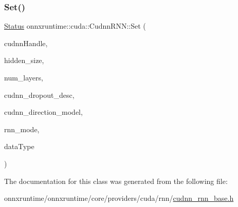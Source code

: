 \subsubsection{\texorpdfstring{Set()}{Set()}}
{\footnotesize\ttfamily \mbox{\hyperlink{classonnxruntime_1_1common_1_1Status}{Status}} onnxruntime\+::cuda\+::\+Cudnn\+R\+N\+N\+::\+Set (\begin{DoxyParamCaption}\item[{const cudnn\+Handle\+\_\+t \&}]{cudnn\+Handle,  }\item[{int64\+\_\+t}]{hidden\+\_\+size,  }\item[{int}]{num\+\_\+layers,  }\item[{cudnn\+Dropout\+Descriptor\+\_\+t}]{cudnn\+\_\+dropout\+\_\+desc,  }\item[{cudnn\+Direction\+Mode\+\_\+t}]{cudnn\+\_\+direction\+\_\+model,  }\item[{cudnn\+R\+N\+N\+Mode\+\_\+t}]{rnn\+\_\+mode,  }\item[{cudnn\+Data\+Type\+\_\+t}]{data\+Type }\end{DoxyParamCaption})\hspace{0.3cm}{\ttfamily [inline]}}



The documentation for this class was generated from the following file\+:\begin{DoxyCompactItemize}
\item 
onnxruntime/onnxruntime/core/providers/cuda/rnn/\mbox{\hyperlink{cudnn__rnn__base_8h}{cudnn\+\_\+rnn\+\_\+base.\+h}}\end{DoxyCompactItemize}
